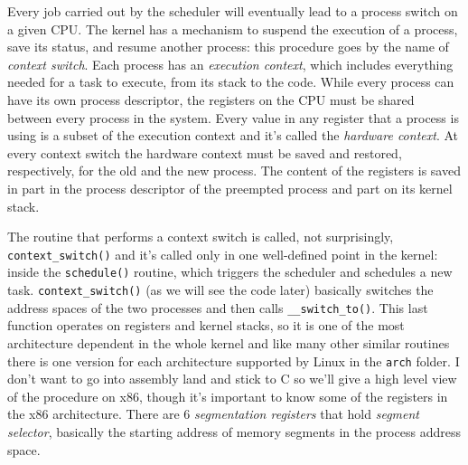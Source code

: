 \documentclass[10pt]{book}
\begin{document}
Every job carried out by the scheduler will eventually lead to a process switch on a given CPU. The kernel has a mechanism to suspend the execution of a process, save its status, and resume another process: this procedure goes by the name of \textit{context switch}. Each process has an \textit{execution context}, which includes everything needed for a task to execute, from its stack to the code. While every process can have its own process descriptor, the registers on the CPU must be shared between every process in the system. Every value in any register that a process is using is a subset of the execution context and it's called the \textit{hardware context}. At every context switch the hardware context must be saved and restored, respectively, for the old and the new process. The content of the registers is saved in part in the process descriptor of the preempted process and part on its kernel stack.

The routine that performs a context switch is called, not surprisingly, \verb|context_switch()| and it's called only in one well-defined point in the kernel: inside the \verb|schedule()| routine, which triggers the scheduler and schedules a new task. \verb|context_switch()| (as we will see the code later) basically switches the address spaces of the two processes and then calls \verb|__switch_to()|. This last function operates on registers and kernel stacks, so it is one of the most architecture dependent in the whole kernel and like many other similar routines there is one version for each architecture supported by Linux in the \verb|arch| folder. I don't want to go into assembly land and stick to C so we'll give a high level view of the procedure on x86, though it's important to know some of the registers in the x86 architecture. There are 6 \textit{segmentation registers} that hold \textit{segment selector}, basically the starting address of memory segments in the process address space.
\end{document}
